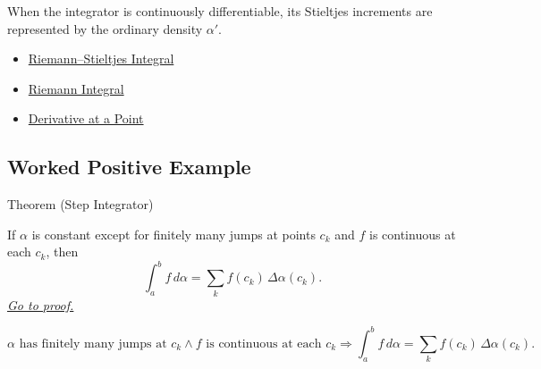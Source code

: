 \begin{remark*}[Interpretation]
When the integrator is continuously differentiable, its Stieltjes increments
are represented by the ordinary density \(\alpha'\).
\end{remark*}

\begin{dependencies}
\begin{itemize}
  \item \hyperref[def:riemann-stieltjes-integral]{Riemann--Stieltjes Integral}
  \item \hyperref[def:riemann-integral]{Riemann Integral}
  \item \hyperref[def:derivative-at-a-point]{Derivative at a Point}
\end{itemize}
\end{dependencies}

\subsection*{Worked Positive Example}

\begin{theorembox}{Theorem (Step Integrator)}
\begin{theorem}
\label{thm:rs-step-integrator-finite-sum}
If \(\alpha\) is constant except for finitely many jumps at points \(c_k\) and
\(f\) is continuous at each \(c_k\), then
\[
  \int_a^b f\,d\alpha=\sum_k f(c_k)\,\Delta\alpha(c_k).
\]
\hyperref[prf:rs-step-integrator-finite-sum]{\textit{Go to proof.}}
\end{theorem}
\end{theorembox}

\begin{remark*}
\[
\alpha\text{ has finitely many jumps at }c_k
\land
f\text{ is continuous at each }c_k
\Longrightarrow
\int_a^b f\,d\alpha=\sum_k f(c_k)\,\Delta\alpha(c_k).
\]
\end{remark*}

